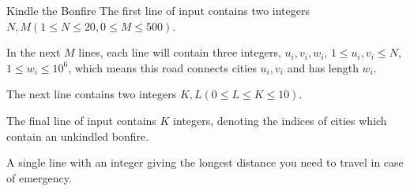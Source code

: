 \begin{problem}{Kindle the Bonfire}
The first line of input contains two integers $N, M (1 \le N \le 20,
0 \le M \le 500)$.

In the next $M$ lines, each line will contain three integers,
$u_i, v_i, w_i$, $1 \le u_i, v_i \le N$, $1 \le w_i \le 10^6$, which means
this road connects cities $u_i, v_i$ and has length $w_i$.

The next line contains two integers $K, L (0 \le L \le K \le 10)$. 

The final line of input contains $K$ integers, denoting the indices of cities
which contain an unkindled bonfire.
\OutputFile

A single line with an integer giving the longest distance you need to travel
in case of emergency.

\Examples

\begin{example}
%
%
\end{example}
\end{problem}
